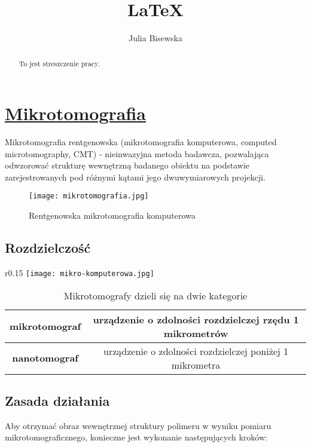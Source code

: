 \documentclass{article}
\title{\LaTeX}
\author{Julia Bisewska}
\begin{document}
\maketitle
\newpage
\begin{abstract}
    To jest streszczenie pracy.
\end{abstract}

\tableofcontents

\newpage

\section{\underline{Mikrotomografia}\cite{mikrotomografia}}
Mikrotomografia rentgenowska (mikrotomografia komputerowa, computed microtomography, CMT) - nieinwazyjna metoda badawcza, pozwalająca odwzorować strukturę wewnętrzną badanego obiektu na podstawie zarejestrowanych pod różnymi kątami jego dwuwymiarowych projekcji. 

\begin{figure}[h!]
\centering
\texttt{[image: mikrotomografia.jpg]}
\caption{Rentgenowska mikrotomografia komputerowa}
\label{fig:rysunek1}
\end{figure}

\subsection{Rozdzielczość}

\begin{wrapfigure}{r}{0.15\textwidth}
\texttt{[image: mikro-komputerowa.jpg]}
\label{fig:rysunek2}
\end{wrapfigure}
\begin{table}[h]
\begin{center}
\caption{Mikrotomografy dzieli się na dwie kategorie}
\begin{tabular}{ |c|c| }
\hline
 \textbf{mikrotomograf} & urządzenie o zdolności rozdzielczej rzędu 1 mikrometrów  \\ \hline
 \textbf{nanotomograf} & urządzenie o zdolności rozdzielczej poniżej 1 mikrometra \\
\hline
\end{tabular}
\label{tab:tabela1}
\end{center}
\end{table}


\subsection{Zasada działania}
Aby otrzymać obraz wewnętrznej struktury polimeru w wyniku pomiaru mikrotomograficznego, konieczne jest wykonanie następujących kroków:
\end{document}
